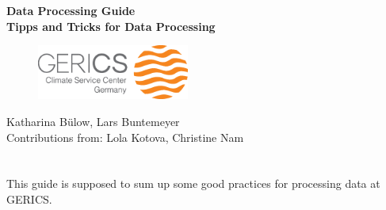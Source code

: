 \documentclass[12pt]{article}              %
\begin{document}

\titlepage
\vspace*{2cm}
\begin{center}
\textbf{\huge{Data Processing Guide}}\\
\vspace*{1cm}
\vspace{1cm}
\textbf{\Large Tipps and Tricks for Data Processing } \\
\vspace*{4cm}
\begin{figure} [h!tb]
\begin{center}
\includegraphics[width=5cm, natwidth=200, natheight=195]{./fig/Logo_GERICS_final.eps} \\
\end{center}
\end{figure}
\normalsize
\vspace*{5cm} 
{\Large{Katharina B{\"u}low, Lars Buntemeyer}}\\
{\Large {Contributions from: Lola Kotova, Christine Nam}}\\
\Large
\vspace*{2cm}
\normalsize
\end{center}


\chapter*{}

This guide is supposed to sum up some good practices for processing data at GERICS. 

\setcounter{page}{2}                    %

\tableofcontents                        %




 
 
%
%
\appendix
%
%


\end{document}
